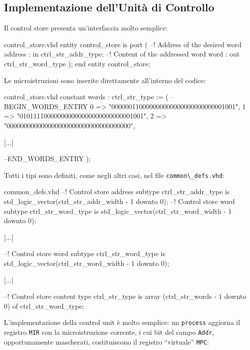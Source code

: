 \documentclass[a4paper,12pt]{scrreprt}
\begin{document}
\subsection{Implementazione dell'Unità di Controllo}

Il control store presenta un'interfaccia molto semplice:

\begin{myvhdl}{control\_store.vhd}
entity control_store is
  port (
    --! Address of the desired word
    address : in  ctrl_str_addr_type;
    --! Content of the addressed word
    word    : out ctrl_str_word_type
    );
end entity control_store;
\end{myvhdl}

Le microistruzioni sono inserite direttamente all'interno del codice:

\begin{myvhdl}{control\_store.vhd}
constant words : ctrl_str_type := (
--BEGIN_WORDS_ENTRY
0 => "000000110000000000000000000000001001",
1 => "010111100000000000000000000000001001",
2 => "000000000000000000000000000000000000",

[...]

--END_WORDS_ENTRY
);
\end{myvhdl}

Tutti i tipi sono definiti, come negli altri casi, nel file
\lstinline{common\_defs.vhd}:

\begin{myvhdl}{common\_defs.vhd}
--! Control store address
subtype ctrl_str_addr_type is std_logic_vector(ctrl_str_addr_width - 1 downto 0);
--! Control store word
subtype ctrl_str_word_type is std_logic_vector(ctrl_str_word_width - 1 downto 0);

[...]

--! Control store word
subtype ctrl_str_word_type is std_logic_vector(ctrl_str_word_width - 1 downto 0);

[...]

--! Control store content
type ctrl_str_type is array (ctrl_str_words - 1 downto 0) of ctrl_str_word_type;
\end{myvhdl}

L'implementazione della control unit è molto semplice: un \lstinline{process}
aggiorna il registro \lstinline{MIR} con la microistruzione corrente, i cui bit
del campo \lstinline{Addr}, opportunamente mascherati, costituiscono il registro
``virtuale'' \lstinline{MPC}:
\end{document}
